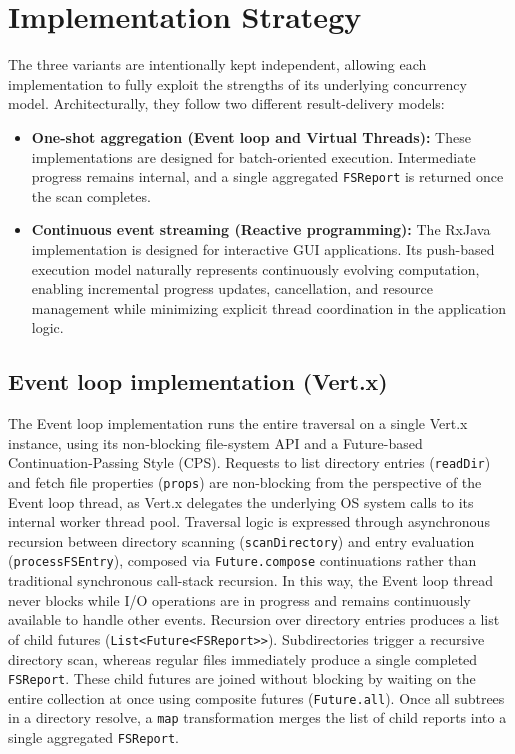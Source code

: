 \documentclass[11pt,a4paper]{article}
\begin{document}
\section{Implementation Strategy}

The three variants are intentionally kept independent, allowing each implementation to fully exploit the strengths of its underlying concurrency model. Architecturally, they follow two different result-delivery models:

\begin{itemize}
	\item \textbf{One-shot aggregation (Event loop and Virtual Threads):} These implementations are designed for batch-oriented execution. Intermediate progress remains internal, and a single aggregated \texttt{FSReport} is returned once the scan completes.
	\item \textbf{Continuous event streaming (Reactive programming):} The RxJava implementation is designed for interactive GUI applications. Its push-based execution model naturally represents continuously evolving computation, enabling incremental progress updates, cancellation, and resource management while minimizing explicit thread coordination in the application logic.
\end{itemize}

\subsection{Event loop implementation (Vert.x)}

The Event loop implementation runs the entire traversal on a single Vert.x instance, using its non-blocking file-system API and a Future-based Continuation-Passing Style (CPS). Requests to list directory entries (\texttt{readDir}) and fetch file properties (\texttt{props}) are non-blocking from the perspective of the Event loop thread, as Vert.x delegates the underlying OS system calls to its internal worker thread pool. Traversal logic is expressed through asynchronous recursion between directory scanning (\texttt{scanDirectory}) and entry evaluation (\texttt{processFSEntry}), composed via \texttt{Future.compose} continuations rather than traditional synchronous call-stack recursion. In this way, the Event loop thread never blocks while I/O operations are in progress and remains continuously available to handle other events. Recursion over directory entries produces a list of child futures (\texttt{List<Future<FSReport>>}). Subdirectories trigger a recursive directory scan, whereas regular files immediately produce a single completed \texttt{FSReport}. These child futures are joined without blocking by waiting on the entire collection at once using composite futures (\texttt{Future.all}). Once all subtrees in a directory resolve, a \texttt{map} transformation merges the list of child reports into a single aggregated \texttt{FSReport}.
\end{document}
